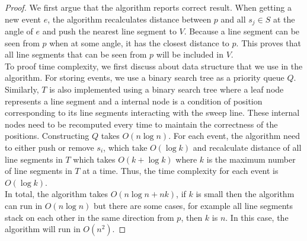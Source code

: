 \documentclass[12pt]{article}
\begin{document}
\begin{proof}
We first argue that the algorithm reports correct result. When getting a new event $e$, the algorithm recalculates distance between $p$ and all $s_j \in S$ at the angle of $e$ and push the nearest line segment to $V$.   Because a line segment can be seen from $p$ when at some angle, it has the closest distance to $p$. This proves that all line segments that can be seen from $p$ will be included in $V$. \\

To proof time complexity, we first discuss about data structure that we use in the algorithm. For storing events, we use a binary search tree as a priority queue $Q$. Similarly, $T$ is also implemented using a binary search tree where a leaf node represents a line segment and a internal node is a condition of position corresponding to its line segments interacting with the sweep line. These internal nodes need to be recomputed every time to maintain the correctness of the positions. Constructing $Q$ takes $O(n\log{n})$. For each event, the algorithm need to either push or remove $s_i$, which take $O(\log{k})$ and recalculate distance of all line segments in $T$ which takes $O(k+\log{k})$ where $k$ is the maximum number of line segments in $T$ at a time. Thus, the time complexity for each event is $O(\log{k})$. \\

In total, the algorithm takes $O(n\log{n} + nk)$, if $k$ is small then the algorithm can run in $O(n\log{n})$ but there are some cases, for example all line segments stack on each other in the same direction from $p$, then $k$ is $n$. In this case, the algorithm will run in $O(n^2)$.
\end{proof}


\end{document}
